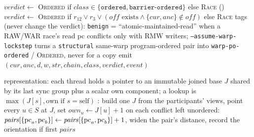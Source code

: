 \begin{algorithm}[H]
{{    
    $\mathit{verdict}\gets$ \textsc{Ordered} if $\mathit{class}\in\{\texttt{ordered},\texttt{barrier-ordered}\}$ else \textsc{Race}\;
  }
  \Else(){
    $\mathit{verdict}\gets$ \textsc{Ordered} if $r_{12}\vee r_3\vee(\mathit{off}\text{ exists}\wedge\{\mathit{cur},\mathit{anc}\}\notin\mathit{off})$ else \textsc{Race}\;
  }
  tags (never change the verdict): \texttt{benign} = ``atomic-maintained-read'' when a RAW/WAR race's read pc conflicts only with RMW writers; \texttt{--assume-warp-lockstep} turns a \texttt{structural} same-warp program-ordered pair into \texttt{warp-po-ordered} / \textsc{Ordered}, never for a copy\;
  emit $(\mathit{cur},\mathit{anc},d,w,\mathit{str},\mathit{chain},\mathit{class},\mathit{verdict},\mathit{event})$\;
}
\end{algorithm}

\begin{algorithm}[H]
\small
\caption{Scalar-clock mode --- offline barrier-only pass (\texttt{barrier\_only\_pairs})}\label{alg:sc-offline}
representation: each thread holds a pointer to an immutable joined base $J$ shared by its last sync group plus a scalar own component; a lookup is $\max(J[s],\text{own if }s=\text{self})$\;
: build one $J$ from the participants' views, point every $u\in S$ at $J$, set $\mathit{own}_u\gets J[u]+1$ \;
on each conflict left unordered: $\mathit{pairs}[\{\operatorname{pc}_a,\operatorname{pc}_b\}]\gets\mathit{pairs}[\{\operatorname{pc}_a,\operatorname{pc}_b\}]+1$, widen the pair's distance, record the orientation if first\;
\Return $\mathit{pairs}$ \;
\end{algorithm}

